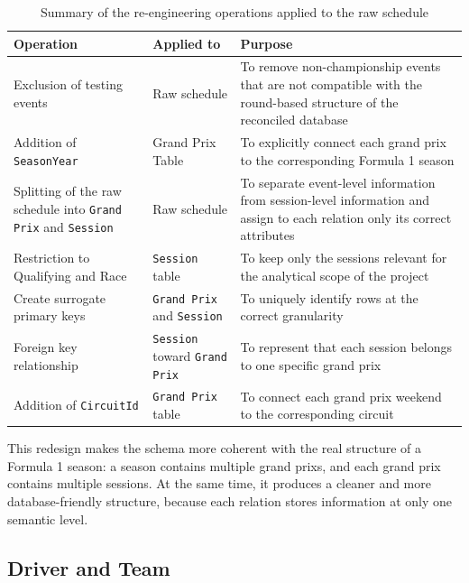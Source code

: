 \documentclass[12pt,a4paper]{article}
\begin{document}
	\begin{table}[H]
		\centering
		\caption{Summary of the re-engineering operations applied to the raw schedule}
		\renewcommand{\arraystretch}{1.2}
		\begin{tabularx}{\textwidth}{>{\raggedright\arraybackslash}p{3.6cm} >{\raggedright\arraybackslash}p{3.2cm} >{\raggedright\arraybackslash}X}
			\toprule
			\textbf{Operation} & \textbf{Applied to} & \textbf{Purpose} \\
			\midrule

			Exclusion of testing events & Raw schedule & To remove non-championship events that are not compatible with the round-based structure of the reconciled database  \\
			\addlinespace
			Addition of \texttt{SeasonYear} & Grand Prix  Table & To explicitly connect each grand prix to the corresponding Formula 1 season \\
			\addlinespace
			Splitting of the raw schedule into \texttt{Grand Prix} and \texttt{Session} & Raw schedule & To separate event-level information from session-level information and assign to each relation only its correct attributes \\
			\addlinespace
			Restriction to Qualifying and Race & \texttt{Session} table & To keep only the sessions relevant for the analytical scope of the project \\
			\addlinespace
			Create surrogate primary keys & \texttt{Grand Prix} and \texttt{Session} & To uniquely identify rows at the correct granularity \\
			\addlinespace
			Foreign key relationship & \texttt{Session} toward \texttt{Grand Prix} & To represent that each session belongs to one specific grand prix \\
			\addlinespace
			Addition of \texttt{CircuitId} & \texttt{Grand Prix} table & To connect each grand prix weekend to the corresponding circuit \\
			\bottomrule
		\end{tabularx}
	\end{table}
	
	This redesign makes the schema more coherent with the real structure of a Formula 1 season:
	a season contains multiple grand prixs, and each grand prix contains multiple sessions.
	At the same time, it produces a cleaner and more database-friendly structure, because each relation stores information at only one semantic level.
	
	
	\subsection{Driver and Team}
	
\end{document}
